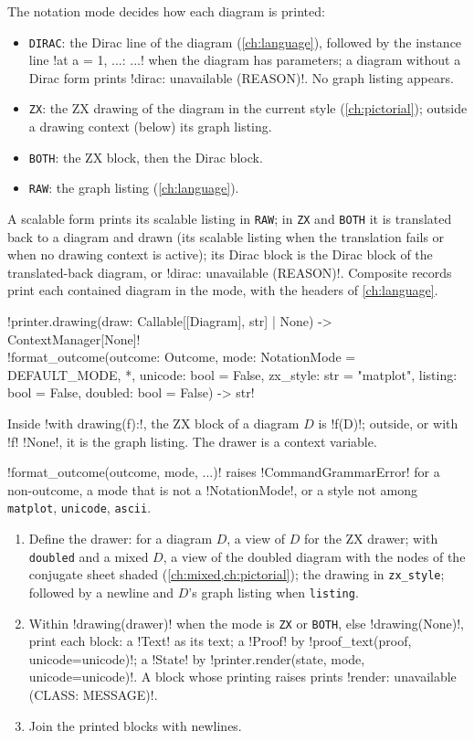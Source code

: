 The notation mode decides how each diagram is printed:
\begin{itemize}
\item \texttt{DIRAC}: the Dirac line of the diagram (\cref{ch:language}), followed by the instance line \code!at a = 1, ...: ...! when the diagram has parameters; a diagram without a Dirac form prints \code!dirac: unavailable (REASON)!. No graph listing appears.
\item \texttt{ZX}: the ZX drawing of the diagram in the current style (\cref{ch:pictorial}); outside a drawing context (below) its graph listing.
\item \texttt{BOTH}: the ZX block, then the Dirac block.
\item \texttt{RAW}: the graph listing (\cref{ch:language}).
\end{itemize}
A scalable form prints its scalable listing in \texttt{RAW}; in \texttt{ZX} and \texttt{BOTH} it is translated back to a diagram and drawn (its scalable listing when the translation fails or when no drawing context is active); its Dirac block is the Dirac block of the translated-back diagram, or \code!dirac: unavailable (REASON)!. Composite records print each contained diagram in the mode, with the headers of \cref{ch:language}.

\begin{signature}
\py!printer.drawing(draw: Callable[[Diagram], str] | None) -> ContextManager[None]!\\
\code!format_outcome(outcome: Outcome, mode: NotationMode = DEFAULT_MODE, *, unicode: bool = False, zx_style: str = "matplot", listing: bool = False, doubled: bool = False) -> str!
\end{signature}
Inside \py!with drawing(f):!, the ZX block of a diagram $D$ is \py!f(D)!; outside, or with \py!f! \py!None!, it is the graph listing. The drawer is a context variable.

\begin{algorithm}\label{alg:shell-format}
\leavevmode
\py!format_outcome(outcome, mode, ...)! raises \py!CommandGrammarError! for a non-outcome, a mode that is not a \py!NotationMode!, or a style not among \texttt{matplot}, \texttt{unicode}, \texttt{ascii}.
\begin{enumerate}
\item Define the drawer: for a diagram $D$, a view of $D$ for the ZX drawer; with \texttt{doubled} and a mixed $D$, a view of the doubled diagram with the nodes of the conjugate sheet shaded (\cref{ch:mixed,ch:pictorial}); the drawing in \texttt{zx\_style}; followed by a newline and $D$'s graph listing when \texttt{listing}.
\item Within \py!drawing(drawer)! when the mode is \texttt{ZX} or \texttt{BOTH}, else \py!drawing(None)!, print each block: a \py!Text! as its text; a \py!Proof! by \py!proof_text(proof, unicode=unicode)!; a \py!State! by \py!printer.render(state, mode, unicode=unicode)!. A block whose printing raises prints \code!render: unavailable (CLASS: MESSAGE)!.
\item Join the printed blocks with newlines.
\end{enumerate}
\end{algorithm}

